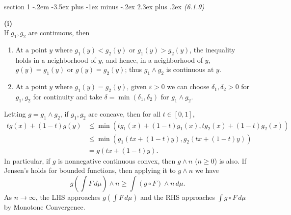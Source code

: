 \documentclass[12pt]{article}
\makeatletter
\theoremstyle{norm}
\newcommand{\al}[0]{\alpha}
\newcommand{\de}[0]{\delta}
\newcommand{\ep}[0]{\varepsilon}
\newcommand{\pa}[1]{\left( {#1} \right)}
\newcommand{\an}[1]{\left\langle {#1}\right\rangle}
\newcommand{\subprob}[1]{\noindent\textbf{#1}\\}
\newcommand{\iy}[0]{\infty}
\newenvironment{problem}{\@startsection
       {section}
       {1}
       {-.2em}
       {-3.5ex plus -1ex minus -.2ex}
       {2.3ex plus .2ex}
       {\pagebreak[3]%
       \large\bf\noindent{Problem }
       }
       }
       {%
       }
\makeatother
\begin{document}
\begin{problem}{\it(6.1.9)}
%
%
%

\subprob{(i)}
If $g_1,g_2$ are continuous, then
\begin{enumerate}
\item At a point $y$ where $g_1(y)< g_2(y)$ or $g_1(y)>g_2(y)$, the inequality holds in a neighborhood of $y$, and hence, in a neighborhood of $y$, $g(y)=g_1(y)$ or $g(y)=g_2(y)$; thus $g_1\wedge g_2$ is continuous at $y$.
\item At a point $y$ where $g_1(y)=g_2(y)$, given $\ep>0$ we can choose $\de_1,\de_2>0$ for $g_1,g_2$ for continuity and take $\de=\min(\de_1,\de_2)$ for $g_1\wedge g_2$.
\end{enumerate}
Letting $g=g_1\wedge g_2$, if $g_1,g_2$ are concave, then for all $t\in [0,1]$,
\begin{align*}
tg(x)+(1-t)g(y)&\le \min(tg_1(x)+(1-t)g_1(x),tg_2(x)+(1-t)g_2(x))\\
&\le \min(g_1(tx+(1-t)y), g_2(tx+(1-t)y))\\
&=g(tx+(1-t)y).
\end{align*}
In particular, if $g$ is nonnegative continuous convex, then $g\wedge n$ ($n\ge0$) is also. If Jensen's holds for bounded functions, then applying it to $g\wedge n$ we have
\[
g\pa{\int F \,d\mu}\wedge n \ge \int (g\circ F)\wedge n\,d\mu.
\]
As $n\to \iy$, the LHS approaches $g\pa{\int F\,d\mu}$ and the RHS approaches $\int g\circ F\,d\mu$ by Monotone Convergence.


\end{problem}
\end{document}
